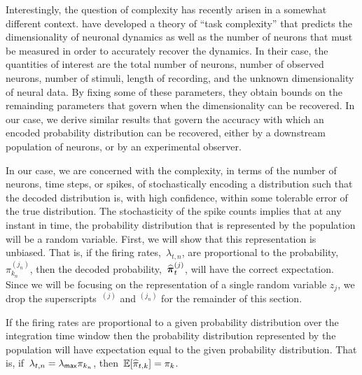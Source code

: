 Interestingly, the question of complexity has recently arisen in a
somewhat different context. \citet{gao2015simplicity} have developed a
theory of ``task complexity'' that predicts the dimensionality of
neuronal dynamics as well as the number of neurons that must be
measured in order to accurately recover the dynamics. In their case,
the quantities of interest are the total number of neurons, number of
observed neurons, number of stimuli, length of recording, and the
unknown dimensionality of neural data. By fixing some of these
parameters, they obtain bounds on the remainding parameters that
govern when the dimensionality can be recovered. In our case, we
derive similar results that govern the accuracy with which an encoded
probability distribution can be recovered, either by a downstream
population of neurons, or by an experimental observer.

In our case, we are concerned with the complexity, in terms of the
number of neurons, time steps, or spikes, of stochastically encoding a
distribution such that the decoded distribution is, with high
confidence, within some tolerable error of the true distribution.
The stochasticity of the spike counts implies that at any instant in
time, the probability distribution that is represented by the
population will be a random variable.  First, we will show that this
representation is unbiased. That is, if the firing rates,~$\lambda_{t,
  n}$, are proportional to the probability,~$\pi_{k_n}^{(j_n)}$, then
the decoded probability,~$\widehat{\boldsymbol{\pi}}_{t}^{(j)}$, will have the
correct expectation.  Since we will be focusing on the representation
of a single random variable $z_j$, we drop the superscripts~${}^{(j)}$
and ${}^{(j_n)}$ for the remainder of this section.

\begin{lemma}
\label{lem:consistency}
If the firing rates are proportional to a given probability
distribution over the integration time window then the probability
distribution represented by the population will have expectation equal
to the given probability distribution.  That is,
if~$\lambda_{t, n}=\lambda_{\mathsf{max}} \pi_{k_n}$,
then~$\mathbb{E}[\widehat{\pi}_{t,k}] = \pi_{k}$.
\end{lemma}

